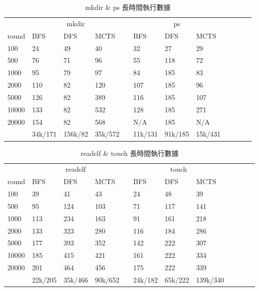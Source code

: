 \documentclass[12pt,a4paper,oneside]{book}
\begin{document}
\begin{appendices}
\begin{table}[htbp]
\centering
\caption{mkdir \& ps 長時間執行數據}
\label{testMethodC}
\begin{tabular}{@{}llllllllllll@{}} \toprule
             & \multicolumn{3}{c}{mkdir} & \phantom{abc} & \multicolumn{3}{c}{ps} \\ \cmidrule{2-4} \cmidrule{6-8}
round      & BFS   & DFS  & MCTS & & BFS   & DFS & MCTS     \\ \midrule
100        & 24    & 49   & 40   & & 32    & 27  & 29       \\
500        & 76    & 71   & 96   & & 55    & 118 & 72       \\
1000       & 95    & 79   & 97   & & 84    & 185 & 83       \\
2000       & 110   & 82   & 120  & & 107   & 185 & 96       \\
5000       & 126   & 82   & 389  & & 116   & 185 & 107      \\
10000      & 133   & 82   & 532  & & 128   & 185 & 271      \\
20000      & 154   & 82   & 568  & & N/A   & 185 & N/A       \\
& 34k/171 & 156k/82 & 35k/572 & & 11k/131 & 91k/185 & 15k/431 \\ \bottomrule
\end{tabular}
\end{table}

\begin{table}[htbp]
\centering
\caption{readelf \& touch 長時間執行數據}
\label{testMethodD}
\begin{tabular}{@{}llllllllllll@{}} \toprule
             & \multicolumn{3}{c}{readelf} & \phantom{abc} & \multicolumn{3}{c}{touch} \\ \cmidrule{2-4} \cmidrule{6-8}
round      & BFS   & DFS  & MCTS & & BFS   & DFS & MCTS     \\ \midrule
100        & 39    & 41   & 43   & & 24    & 48  & 39       \\
500        & 95    & 124  & 103  & & 71    & 117 & 141      \\
1000       & 113   & 234  & 163  & & 91    & 161 & 218      \\
2000       & 133   & 323  & 280  & & 116   & 184 & 286      \\
5000       & 177   & 393  & 352  & & 142   & 222 & 307      \\
10000      & 185   & 415  & 421  & & 161   & 222 & 334      \\
20000      & 201   & 464  & 456  & & 175   & 222 & 339      \\ 
& 22k/205 & 35k/466 & 90k/652  & & 24k/182 & 65k/222 & 139k/340 \\ \bottomrule
\end{tabular}
\end{table}

\end{appendices}
\end{document}

